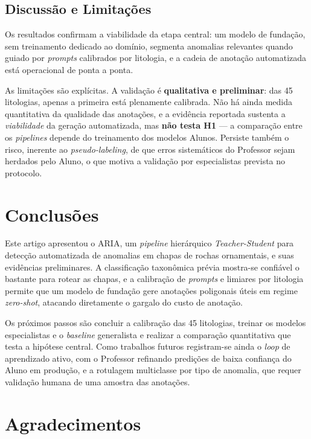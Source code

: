 \documentclass[10pt,conference]{IEEEtran}
\begin{document}
\subsection{Discussão e Limitações}

Os resultados confirmam a viabilidade da etapa central: um modelo de fundação, sem treinamento dedicado ao domínio, segmenta anomalias relevantes quando guiado por \textit{prompts} calibrados por litologia, e a cadeia de anotação automatizada está operacional de ponta a ponta.

As limitações são explícitas. A validação é \textbf{qualitativa e preliminar}: das 45 litologias, apenas a primeira está plenamente calibrada. Não há ainda medida quantitativa da qualidade das anotações, e a evidência reportada sustenta a \textit{viabilidade} da geração automatizada, mas \textbf{não testa H1} --- a comparação entre os \textit{pipelines} depende do treinamento dos modelos Alunos. Persiste também o risco, inerente ao \textit{pseudo-labeling}, de que erros sistemáticos do Professor sejam herdados pelo Aluno, o que motiva a validação por especialistas prevista no protocolo.

\section{Conclusões}

Este artigo apresentou o ARIA, um \textit{pipeline} hierárquico \textit{Teacher-Student} para detecção automatizada de anomalias em chapas de rochas ornamentais, e suas evidências preliminares. A classificação taxonômica prévia mostra-se confiável o bastante para rotear as chapas, e a calibração de \textit{prompts} e limiares por litologia permite que um modelo de fundação gere anotações poligonais úteis em regime \textit{zero-shot}, atacando diretamente o gargalo do custo de anotação.

Os próximos passos são concluir a calibração das 45 litologias, treinar os modelos especialistas e o \textit{baseline} generalista e realizar a comparação quantitativa que testa a hipótese central. Como trabalhos futuros registram-se ainda o \textit{loop} de aprendizado ativo, com o Professor refinando predições de baixa confiança do Aluno em produção, e a rotulagem multiclasse por tipo de anomalia, que requer validação humana de uma amostra das anotações.

\section*{Agradecimentos}
\end{document}

